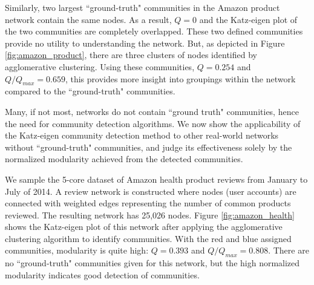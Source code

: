 \documentclass{IEEEtran}
\begin{document}
	Similarly, two largest ``ground-truth" communities in the Amazon product network \cite{youtube,DBLP} contain the same nodes. As a result, $Q=0$ and the Katz-eigen plot of the two communities are completely overlapped. These two defined communities provide no utility to understanding the network. But, as depicted in Figure \ref{fig:amazon_product}, there are three clusters of nodes identified by agglomerative clustering. Using these communities, $Q=0.254$ and $Q/Q_{max}=0.659$, this provides more insight into groupings within the network compared to the ``ground-truth" communities.
	
	
	
	
	Many, if not most, networks do not contain ``ground truth" communities, hence the need for community detection algorithms. We now show the applicability of the Katz-eigen community detection method to other real-world networks without ``ground-truth" communities, and judge its effectiveness solely by the normalized modularity achieved from the detected communities.
	
	We sample the 5-core dataset of Amazon health product reviews\cite{amazon} from January to July of 2014. A review network is constructed where nodes (user accounts) are connected with weighted edges representing the number of common products reviewed. The resulting network has 25,026 nodes. Figure \ref{fig:amazon_health} shows the Katz-eigen plot of this network after applying the agglomerative clustering algorithm to identify communities. With the red and blue assigned communities, modularity is quite high: $Q=0.393$ and $Q/Q_{max}=0.808$. There are no ``ground-truth" communities given for this network, but the high normalized modularity indicates good detection of communities.
	
\end{document}
